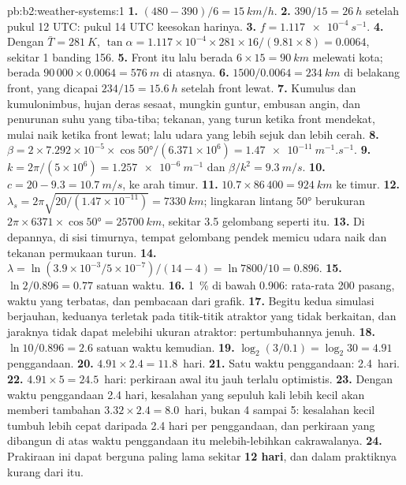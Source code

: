 \begin{solution}{pb:b2:weather-systems:1}
\textbf{1.} $(480 - 390)/6 = \qty{15}{km/h}$.
\textbf{2.} $390/15 = \qty{26}{h}$ setelah pukul 12 UTC: pukul 14 UTC keesokan harinya.
\textbf{3.} $f = \qty{1.117e-4}{s^{-1}}$.
\textbf{4.} Dengan $\bar T = \qty{281}{K}$, $\tan\alpha = 1.117 \times 10^{-4} \times 281 \times
16/(9.81 \times 8) = 0.0064$, sekitar 1 banding 156.
\textbf{5.} Front itu lalu berada $6 \times 15 = \qty{90}{km}$ melewati kota;  berada
$90\,000 \times 0.0064 = \qty{576}{m}$ di atasnya.
\textbf{6.} $1500/0.0064 = \qty{234}{km}$ di belakang front, yang dicapai $234/15 = \qty{15.6}{h}$ setelah
front lewat.
\textbf{7.} Kumulus dan kumulonimbus, hujan deras sesaat, mungkin guntur, embusan angin, dan penurunan
suhu yang tiba-tiba; tekanan, yang turun ketika front mendekat, mulai naik ketika front lewat; lalu
udara yang lebih sejuk dan lebih cerah.
\textbf{8.} $\beta = 2 \times 7.292 \times 10^{-5} \times \cos\ang{50}/(6.371 \times 10^6) =
\qty{1.47e-11}{m^{-1}.s^{-1}}$.
\textbf{9.} $k = 2\pi/(5 \times 10^6) = \qty{1.257e-6}{m^{-1}}$ dan $\beta/k^2 = \qty{9.3}{m/s}$.
\textbf{10.} $c = 20 - 9.3 = \qty{10.7}{m/s}$, ke arah timur.
\textbf{11.} $10.7 \times 86\,400 = \qty{924}{km}$ ke timur.
\textbf{12.} $\lambda_s = 2\pi\sqrt{20/(1.47 \times 10^{-11})} = \qty{7330}{km}$; lingkaran
lintang \ang{50} berukuran $2\pi \times 6371 \times \cos\ang{50} = \qty{25700}{km}$, sekitar 3.5
gelombang seperti itu.
\textbf{13.} Di depannya, di sisi timurnya, tempat gelombang pendek memicu udara naik dan
tekanan permukaan turun.
\textbf{14.} $\lambda = \ln(3.9 \times 10^{-3}/5 \times 10^{-7})/(14 - 4) = \ln 7800/10 = 0.896$.
\textbf{15.} $\ln 2/0.896 = 0.77$ satuan waktu.
\textbf{16.} \qty{1}{\percent} di bawah 0.906: rata-rata 200 pasang, waktu yang terbatas, dan pembacaan dari
grafik.
\textbf{17.} Begitu kedua simulasi berjauhan, keduanya terletak pada titik-titik atraktor yang tidak berkaitan, dan
jaraknya tidak dapat melebihi ukuran atraktor: pertumbuhannya jenuh.
\textbf{18.} $\ln 10/0.896 = 2.6$ satuan waktu kemudian.
\textbf{19.} $\log_2(3/0.1) = \log_2 30 = 4.91$ penggandaan.
\textbf{20.} $4.91 \times 2.4 = 11.8$~hari.
\textbf{21.} Satu waktu penggandaan: 2.4~hari.
\textbf{22.} $4.91 \times 5 = 24.5$~hari: perkiraan awal itu jauh terlalu optimistis.
\textbf{23.} Dengan waktu penggandaan 2.4 hari, kesalahan yang sepuluh kali lebih kecil akan memberi tambahan $3.32 \times 2.4
= 8.0$~hari, bukan 4 sampai 5: kesalahan kecil tumbuh lebih cepat daripada 2.4 hari per penggandaan, dan
perkiraan yang dibangun di atas waktu penggandaan itu melebih-lebihkan cakrawalanya.
\textbf{24.} Prakiraan ini dapat berguna paling lama sekitar \textbf{12 hari}, dan dalam praktiknya
kurang dari itu.
\end{solution}
